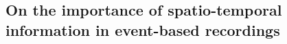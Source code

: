 \documentclass[brainsci, %
               review,submit,pdftex,moreauthors
               ]{Definitions/mdpi}
\begin{document}

\subsection{On the importance of spatio-temporal information in event-based recordings}

\end{document}
